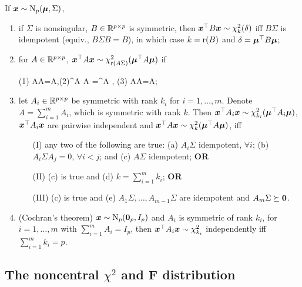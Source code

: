 \documentclass[10pt,a4paper]{book}
\begin{document}
\begin{thmbox}
	\begin{theorem}\label{thm:quad_MVN_general}If ${\boldsymbol x}\sim\mathrm{N}_p({\boldsymbol\mu},\Sigma)$,
		\begin{enumerate}
			\item if $\Sigma$ is nonsingular, $B\in\mathbb R^{p\times p}$ is symmetric, then ${\boldsymbol x}^\top B{\boldsymbol x}\sim\chi_{k}^2(\delta)$ iff $B\Sigma$ is idempotent (equiv., $B\Sigma B=B$), in which case $k=\mathrm{r}(B)$ and $\delta={\boldsymbol\mu}^\top B{\boldsymbol\mu}$;
			
			\item for $A\in\mathbb R^{p\times p}$, ${\boldsymbol x}^\top A {\boldsymbol x}\sim\chi_{\mathrm{r}(A\Sigma)}^2({\boldsymbol\mu}^\top A{\boldsymbol\mu})$ if 
			\begin{sequation*}
				(1) \Sigma A\Sigma A\Sigma=\Sigma A\Sigma,\quad (2)\bam^\TT A \Sigma A \bam=\bam^\TT A \bam, \quad (3) \Sigma A\Sigma A\bam=\Sigma A\bam;
			\end{sequation*} 

			\item let $A_i\in\mathbb R^{p\times p}$ be symmetric with rank $k_i$ for $i=1,\ldots,m$.   
			Denote $A=\sum_{i=1}^m A_i$, which is symmetric with rank $k$.
			Then ${\boldsymbol x}^\top A_i {\boldsymbol x}\sim\chi_{k_i}^2 ({\boldsymbol\mu}^\top A_i{\boldsymbol\mu})$, 
			${\boldsymbol x}^\top A_i{\boldsymbol x}$ are pairwise independent and ${\boldsymbol x}^\top A {\boldsymbol x}\sim\chi_{k}^2 ({\boldsymbol\mu}^\top A {\boldsymbol\mu})$, iff 
			\begin{enumerate}
				\item[(I)] any two of the following are true: (a) $A_i\Sigma$ idempotent, $\forall i$; (b) $A_i\Sigma A_j=0$, $\forall i<j$; and (c) $A\Sigma$ idempotent; \textbf{OR}
				\item[(II)] (c) is true and (d) $k=\sum_{i=1}^{m}k_i$; \textbf{OR}
				\item[(III)] (c) is true and (e) $A_1\Sigma,\ldots,A_{m-1}\Sigma$ are idempotent and $A_m \Sigma\succeq {\boldsymbol 0}$.    
			\end{enumerate}    
			
			\item (Cochran's theorem) ${\boldsymbol x}\sim \mathrm{N}_p({\boldsymbol 0}_p,I_p)$ and $A_i$ is symmetric of rank $k_i$, for $i=1,\ldots,m$ with $\sum_{i=1}^{m}A_i=I_p$,
			then ${\boldsymbol x}^\top A_i {\boldsymbol x} \sim \chi_{k_i}^2$ independently iff $\sum_{i=1}^{m}k_i=p$.       
		\end{enumerate}      
	\end{theorem}
\end{thmbox}

\subsection{The noncentral $\chi^2$ and F distribution}\label{sec:noncen_chi2_F}
\end{document}
